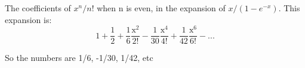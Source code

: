 The coefficients of $x^{n}/n!$  when n is even, in the expansion of $x/(1-e^{-x}).$  This expansion is:
\[ 1 + \frac{1}{2} 
+ \frac{1}{6} \frac{\mathrm{x}^2}{2!}
- \frac{1}{30} \frac{\mathrm{x}^4}{4!}
+ \frac{1}{42} \frac{\mathrm{x}^6}{6!}
- ... \]
\par
So the numbers are 1/6, -1/30, 1/42, etc